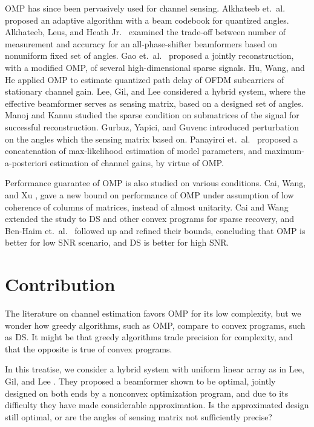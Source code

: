 OMP has since been pervasively used for channel sensing.
Alkhateeb et.\ al.\ \cite {AEL14} proposed an adaptive algorithm with a beam codebook for quantized angles.
Alkhateeb, Leus, and Heath Jr.\ \cite {ALH15} examined the trade-off between number of measurement and accuracy for an all-phase-shifter beamformers based on nonuniform fixed set of angles.
Gao et.\ al.\ \cite {LGC16} proposed a jointly reconstruction, with a modified OMP, of several high-dimensional sparse signals.
Hu, Wang, and He \cite {HWH13} applied OMP to estimate quantized path delay of OFDM subcarriers of stationary channel gain.
Lee, Gil, and Lee \cite {LGL16} considered a hybrid system, where the effective beamformer serves as sensing matrix, based on a designed set of angles.
Manoj and Kannu \cite {MaK17} studied the sparse condition on submatrices of the signal for successful reconstruction.
Gurbuz, Yapici, and Guvenc \cite {GYG18} introduced perturbation on the angles which the sensing matrix based on.
Panayirci et.\ al.\ \cite {PAU19} proposed a concatenation of max-likelihood estimation of model parameters, and maximum-a-posteriori estimation of channel gains, by virtue of OMP.

Performance guarantee of OMP is also studied on various conditions.
Cai, Wang, and Xu \cite {CWX10}, gave a new bound on performance of OMP under assumption of low coherence of columns of matrices, instead of almost unitarity.
Cai and Wang \cite {CaW11} extended the study to DS and other convex programs for sparse recovery, and Ben-Haim et.\ al.\ \cite {BEE10} followed up and refined their bounds, concluding that OMP is better for low SNR scenario, and DS is better for high SNR.



\section {Contribution}

The literature on channel estimation favors OMP for its low complexity, but we wonder how greedy algorithms, such as OMP, compare to convex programs, such as DS.
It might be that greedy algorithms trade precision for complexity, and that the opposite is true of convex programs.

In this treatise, we consider a hybrid system with uniform linear array as in Lee, Gil, and Lee \cite {LGL16}.
They proposed a beamformer shown to be optimal, jointly designed on both ends by a nonconvex optimization program, and due to its difficulty they have made considerable approximation.
Is the approximated design still optimal, or are the angles of sensing matrix not sufficiently precise?


